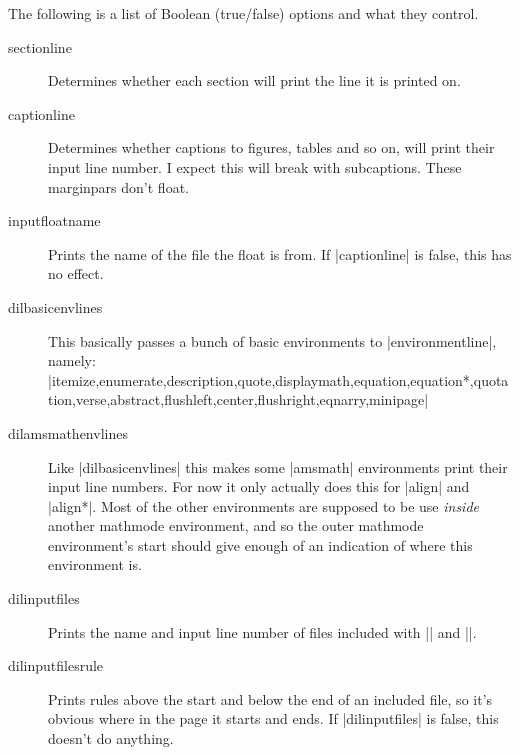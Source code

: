 \documentclass{scrartcl}
\begin{document}
The following is a list of Boolean (true/false) options and what they
control.
\begin{description}
\item[sectionline] Determines whether each section will print the line
  it is printed on.
\item[captionline] Determines whether captions to figures, tables and
  so on, will print their input line number.
  I expect this will break with subcaptions.
  These marginpars don't float.
\item[inputfloatname] Prints the name of the file the float is from.
  If |captionline| is false, this has no effect.
\item[dilbasicenvlines] This basically passes a bunch of basic
  environments to |environmentline|, namely:
  |itemize,enumerate,description,quote,displaymath,equation,equation*,quotation,verse,abstract,flushleft,center,flushright,eqnarry,minipage|
\item[dilamsmathenvlines] Like |dilbasicenvlines| this makes some
  |amsmath| environments print their input line numbers.
  For now it only actually does this for |align| and |align*|.
  Most of the other environments are supposed to be use \emph{inside}
  another mathmode environment, and so the outer mathmode
  environment's start should give enough of an indication of where
  this environment is.
\item[dilinputfiles] Prints the name and input line number of files
  included with || and ||.
\item[dilinputfilesrule] Prints rules above the start and below the
  end of an included file, so it's obvious where in the page it starts
  and ends.
  If |dilinputfiles| is false, this doesn't do anything.
\end{description}
\end{document}
